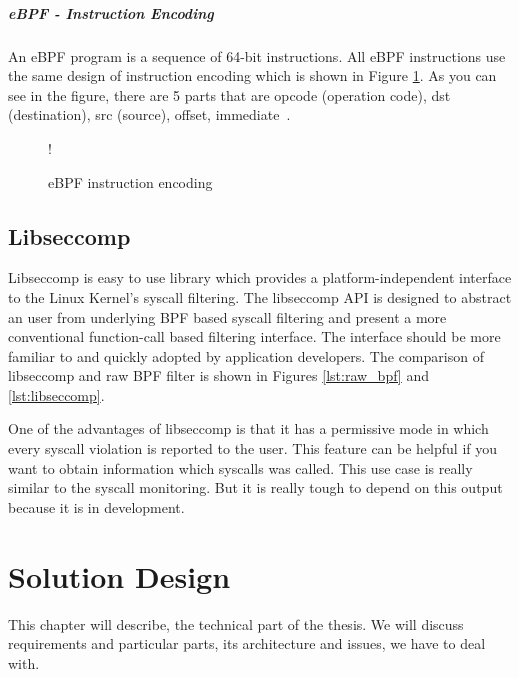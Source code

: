 \paragraph{eBPF - Instruction Encoding}
An eBPF program is a sequence of 64-bit instructions.
All eBPF instructions use the same design of instruction encoding which is shown in Figure \ref{fig:tikz:eBPF_instruction}.
As you can see in the figure, there are 5 parts that are opcode (operation code), dst (destination), src (source), offset, immediate~\cite{kernel_bpf_specification}.

\begin{figure}[h]
  \centering
  \resizebox {\textwidth} {!} {
	
  }
  \caption{eBPF instruction encoding}
  \label{fig:tikz:eBPF_instruction}
\end{figure}

\section{Libseccomp}
Libseccomp \cite{libseccomp_git} is easy to use library which provides a platform-independent interface to the Linux Kernel's syscall filtering.
The libseccomp API is designed to abstract an user from underlying BPF based syscall filtering and present a more conventional function-call based filtering interface.
The interface should be more familiar to and quickly adopted by application developers.
The comparison of libseccomp and raw BPF filter is shown in Figures \ref{lst:raw_bpf} and \ref{lst:libseccomp}.

One of the advantages of libseccomp is that it has a permissive mode in which every syscall violation is reported to the user.
This feature can be helpful if you want to obtain information which syscalls was called.
This use case is really similar to the syscall monitoring.
But it is really tough to depend on this output because it is in development.


\chapter{Solution Design}
\label{chap:design}
This chapter will describe, the technical part of the thesis.
We will discuss requirements and particular parts, its architecture and issues, we have to deal with.

